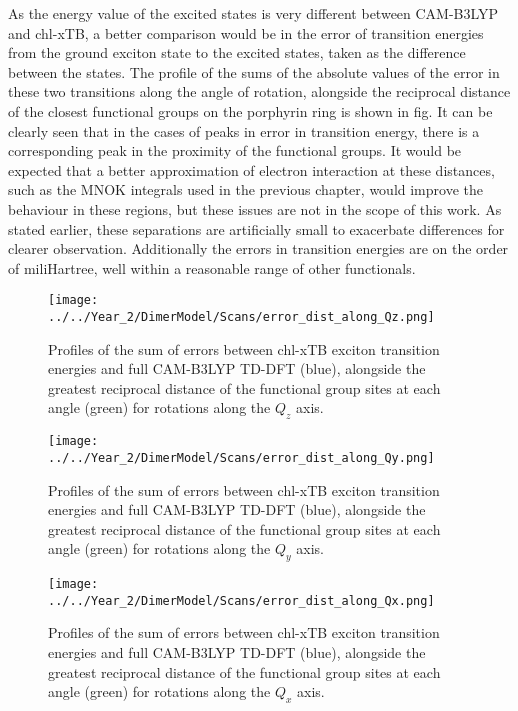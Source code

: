 As the energy value of the excited states is very different between CAM-B3LYP and
chl-xTB, a better comparison would be in the error of transition energies from the
ground exciton state to the excited states, taken as the difference between the 
states. The profile of the sums of the absolute values of the error in these two
transitions along the angle of rotation, alongside the reciprocal distance of the
closest functional groups on the porphyrin ring is shown in fig. It can be clearly 
seen that in the cases of peaks in error in transition energy, there is a corresponding 
peak in the proximity of the functional groups. It would be expected that a better
approximation of electron interaction at these distances, such as the MNOK integrals
used in the previous chapter, would improve the behaviour in these regions, but 
these issues are not in the scope of this work. As stated earlier, these separations
are artificially small to exacerbate differences for clearer observation. Additionally
the errors in transition energies are on the order of miliHartree, well within a
reasonable range of other functionals.

\begin{figure}
    \centering
    \texttt{[image: ../../Year\_2/DimerModel/Scans/error\_dist\_along\_Qz.png]}
    \label{fig:error_along_qz}
    \caption{Profiles of the sum of errors between chl-xTB exciton transition energies
    and full CAM-B3LYP TD-DFT (blue), alongside the greatest reciprocal distance
    of the functional group sites at each angle (green) for rotations along the
    $Q_z$ axis.}
\end{figure}

\begin{figure}
    \centering
    \texttt{[image: ../../Year\_2/DimerModel/Scans/error\_dist\_along\_Qy.png]}
    \label{fig:error_along_qy}
    \caption{Profiles of the sum of errors between chl-xTB exciton transition energies
    and full CAM-B3LYP TD-DFT (blue), alongside the greatest reciprocal distance
    of the functional group sites at each angle (green) for rotations along the
    $Q_y$ axis.}
\end{figure}

\begin{figure}
    \centering
    \texttt{[image: ../../Year\_2/DimerModel/Scans/error\_dist\_along\_Qx.png]}
    \label{fig:error_along_qx}
    \caption{Profiles of the sum of errors between chl-xTB exciton transition energies
    and full CAM-B3LYP TD-DFT (blue), alongside the greatest reciprocal distance
    of the functional group sites at each angle (green) for rotations along the
    $Q_x$ axis.}
\end{figure}

